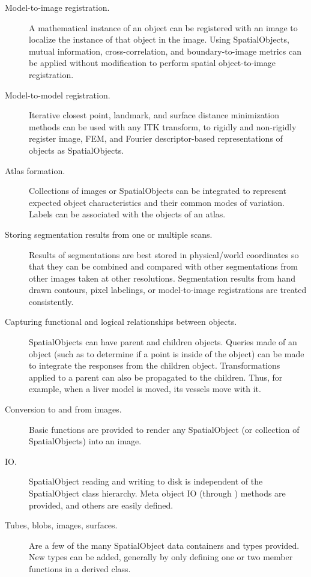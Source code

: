 \begin{description}
  \item[Model-to-image registration.] A mathematical instance of an object
  can be registered with an image to localize the instance of that object in
  the image.  Using SpatialObjects, mutual information, cross-correlation, and
  boundary-to-image metrics can be applied without modification to
  perform spatial object-to-image registration.

  \item[Model-to-model registration.] Iterative closest point, landmark, and
  surface distance minimization methods can be used with any ITK transform,
  to rigidly and non-rigidly register image, FEM, and Fourier
  descriptor-based representations of objects as SpatialObjects.

  \item[Atlas formation.] Collections of images or SpatialObjects can be
  integrated to represent expected object characteristics and their common
  modes of variation.  Labels can be associated with the objects of an atlas.

  \item[Storing segmentation results from one or multiple scans.] Results of
  segmentations are best stored in physical/world coordinates so that they
  can be combined and compared with other segmentations from other images
  taken at other resolutions.  Segmentation results from hand drawn contours,
  pixel labelings, or model-to-image registrations are treated consistently.

  \item[Capturing functional and logical relationships between objects.]
  SpatialObjects can have parent and children objects.  Queries made of an
  object (such as to determine if a point is inside of the object) can be
  made to integrate the responses from the children object.  Transformations
  applied to a parent can also be propagated to the children.  Thus, for
  example, when a liver model is moved, its vessels move with it.

  \item[Conversion to and from images.] Basic functions are provided to
  render any SpatialObject (or collection of SpatialObjects) into an image.

  \item[IO.] SpatialObject reading and writing to disk is independent of the
  SpatialObject class hierarchy.  Meta object IO (through
  ) methods are provided, and others are easily defined.

  \item[Tubes, blobs, images, surfaces.] Are a few of the many SpatialObject
  data containers and types provided.  New types can be added, generally by
  only defining one or two member functions in a derived class.
\end{description}

